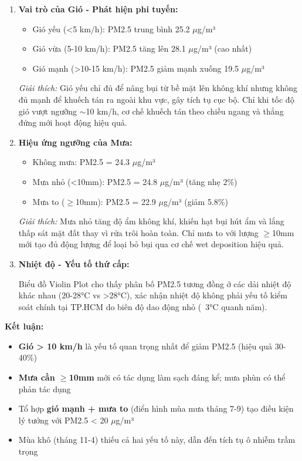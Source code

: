 \documentclass[12pt,a4paper]{article}
\begin{document}
\begin{enumerate}
    \item \textbf{Vai trò của Gió - Phát hiện phi tuyến:}
    \begin{itemize}
        \item Gió yếu (<5 km/h): PM2.5 trung bình 25.2 $\mu$g/m³
        \item Gió vừa (5-10 km/h): PM2.5 tăng lên 28.1 $\mu$g/m³ (cao nhất)
        \item Gió mạnh (>10-15 km/h): PM2.5 giảm mạnh xuống 19.5 $\mu$g/m³
    \end{itemize}
    
    \textit{Giải thích:} Gió yếu chỉ đủ để nâng bụi từ bề mặt lên không khí nhưng không đủ mạnh để khuếch tán ra ngoài khu vực, gây tích tụ cục bộ. Chỉ khi tốc độ gió vượt ngưỡng $\sim$10 km/h, cơ chế khuếch tán theo chiều ngang và thẳng đứng mới hoạt động hiệu quả.
    
    \item \textbf{Hiệu ứng ngưỡng của Mưa:}
    \begin{itemize}
        \item Không mưa: PM2.5 = 24.3 $\mu$g/m³
        \item Mưa nhỏ (<10mm): PM2.5 = 24.8 $\mu$g/m³ (tăng nhẹ 2\%)
        \item Mưa to ($\geq$10mm): PM2.5 = 22.9 $\mu$g/m³ (giảm 5.8\%)
    \end{itemize}
    
    \textit{Giải thích:} Mưa nhỏ tăng độ ẩm không khí, khiến hạt bụi hút ẩm và lắng thấp sát mặt đất thay vì rửa trôi hoàn toàn. Chỉ mưa to với lượng $\geq$10mm mới tạo đủ động lượng để loại bỏ bụi qua cơ chế wet deposition hiệu quả.
    
    \item \textbf{Nhiệt độ - Yếu tố thứ cấp:}
    
    Biểu đồ Violin Plot cho thấy phân bố PM2.5 tương đồng ở các dải nhiệt độ khác nhau (20-28°C vs >28°C), xác nhận nhiệt độ không phải yếu tố kiểm soát chính tại TP.HCM do biên độ dao động nhỏ (~3°C quanh năm).
\end{enumerate}

\textbf{Kết luận:}
\begin{itemize}
    \item \textbf{Gió > 10 km/h} là yếu tố quan trọng nhất để giảm PM2.5 (hiệu quả 30-40\%)
    \item \textbf{Mưa cần $\geq$10mm} mới có tác dụng làm sạch đáng kể; mưa phùn có thể phản tác dụng
    \item Tổ hợp \textbf{gió mạnh + mưa to} (điển hình mùa mưa tháng 7-9) tạo điều kiện lý tưởng với PM2.5 < 20 $\mu$g/m³
    \item Mùa khô (tháng 11-4) thiếu cả hai yếu tố này, dẫn đến tích tụ ô nhiễm trầm trọng
\end{itemize}
\end{document}
